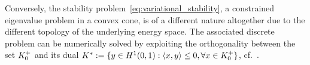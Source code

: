 Conversely, the stability problem~\eqref{eq:variational_stability}, a constrained eigenvalue problem in a convex cone, is of a different nature altogether due to the different topology of the underlying energy space. 
The associated discrete problem can be numerically solved by exploiting the orthogonality between the set $K^+_{0}$ and its dual $K^*:=\{y \in H^1(0,1): \langle x,y \rangle \leq 0, \forall x \in K^+_{0}\}$, cf.~\cite{Moreau1962-fz,Pinto_da_Costa2010-qv}.





